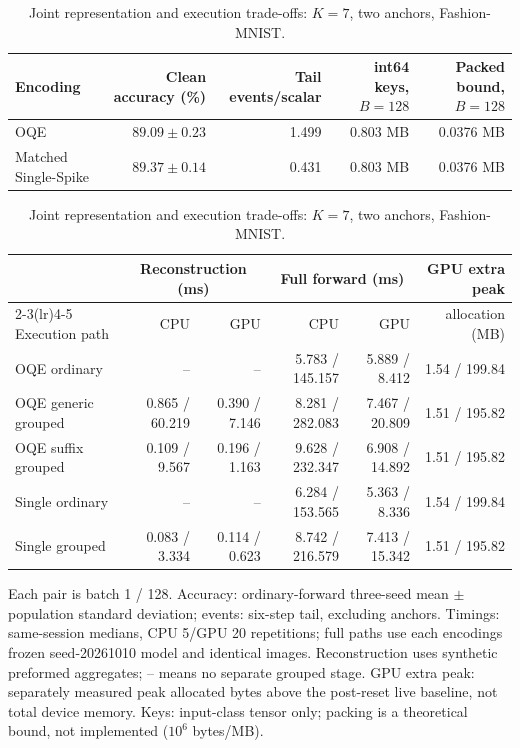 \begin{table}[t]
\centering
\caption{Joint representation and execution trade-offs: $K=7$, two anchors, Fashion-MNIST.}
\label{tab:deployment}
\scriptsize
\setlength{\tabcolsep}{5pt}
\begin{tabular}{lrrrr}
\toprule
Encoding & Clean accuracy (\%) & Tail events/scalar & int64 keys, $B=128$ & Packed bound, $B=128$ \\
\midrule
OQE & $89.09\pm0.23$ & 1.499 & 0.803 MB & 0.0376 MB \\
Matched Single-Spike & $89.37\pm0.14$ & 0.431 & 0.803 MB & 0.0376 MB \\
\bottomrule
\end{tabular}
\par\smallskip
\setlength{\tabcolsep}{4pt}
\begin{tabular}{lrrrrr}
\toprule
& \multicolumn{2}{c}{Reconstruction (ms)} & \multicolumn{2}{c}{Full forward (ms)} & GPU extra peak \\
\cmidrule(lr){2-3}\cmidrule(lr){4-5}
Execution path & CPU & GPU & CPU & GPU & allocation (MB) \\
\midrule
OQE ordinary & -- & -- & 5.783 / 145.157 & 5.889 / 8.412 & 1.54 / 199.84 \\
OQE generic grouped & 0.865 / 60.219 & 0.390 / 7.146 & 8.281 / 282.083 & 7.467 / 20.809 & 1.51 / 195.82 \\
OQE suffix grouped & 0.109 / 9.567 & 0.196 / 1.163 & 9.628 / 232.347 & 6.908 / 14.892 & 1.51 / 195.82 \\
Single ordinary & -- & -- & 6.284 / 153.565 & 5.363 / 8.336 & 1.54 / 199.84 \\
Single grouped & 0.083 / 3.334 & 0.114 / 0.623 & 8.742 / 216.579 & 7.413 / 15.342 & 1.51 / 195.82 \\
\bottomrule
\end{tabular}
\par\smallskip
\begin{minipage}{0.98\textwidth}\scriptsize
Each pair is batch 1 / 128. Accuracy: ordinary-forward three-seed mean $\pm$ population standard deviation;
events: six-step tail, excluding anchors. Timings: same-session medians, CPU 5/GPU 20 repetitions;
full paths use each encoding\textquotesingle s frozen seed-20261010 model and identical images.
Reconstruction uses synthetic preformed aggregates; -- means no separate grouped stage.
GPU extra peak: separately measured peak allocated bytes above the post-reset live baseline, not total device memory.
Keys: input-class tensor only; packing is a theoretical bound, not implemented ($10^6$ bytes/MB).
\end{minipage}
\end{table}
